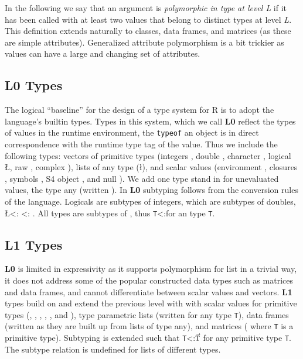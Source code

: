 \documentclass[acmsmall,10pt,review,anonymous]{acmart}\settopmatter{printfolios=true,printccs=false,printacmref=false}
\newcommand{\code}[1]{\lstinline|#1|\xspace}
\begin{document}
In the following we say that an argument is {\it polymorphic in type at
  level L} if it has been called with at least two values that belong to
distinct types at level \emph{L}. This definition extends naturally to
classes, data frames, and matrices (as these are simple attributes).
Generalized attribute polymorphism is a bit trickier as values can have a
large and changing set of attributes.

\subsection{L0 Types}
\label{sec:L0def}

The logical ``baseline'' for the design of a type system for R is to adopt
the language's builtin types.  Types in this system, which we call {\bf L0}
reflect the types of values in the runtime environment, the \code{typeof} an
object is in direct correspondence with the runtime type tag of the value.
Thus we include the following types: vectors of primitive types (integers
\I, double \D, character \C, logical \L, raw \R, complex \X), lists of any
type (\l), and scalar values (environment \sE, closures \sF, symbols \sY, S4
object \sS, and null \sN). We add one type stand in for unevaluated values,
the type any (written \ANY). In {\bf L0} subtyping follows from the
conversion rules of the language.  Logicals are subtypes of integers, which
are subtypes of doubles, \L <: \I <: \D.  All types are subtypes of \ANY,
thus {\tt T}<:\ANY for an type {\tt T}.

%
%
\subsection{L1 Types}
\label{sec:L1def}

{\bf L0} is limited in expressivity as it supports polymorphism for list in
a trivial way, it does not address some of the popular constructed data
types such as matrices and data frames, and cannot differentiate between
scalar values and vectors.  {\bf L1} types build on and extend the previous
level with with scalar values for primitive types (\sI, \sD, \sC, \sL, \sR,
and \sX), type parametric lists (written  for any type {\tt T}), data
frames (written  as they are built up from lists of type any),
and matrices ( where {\tt T} is a primitive type).
Subtyping is extended such that {\tt T}<:{$\vec{\tt T}$} for any primitive
type {\tt T}. The subtype relation is undefined for lists of different
types.
\end{document}
